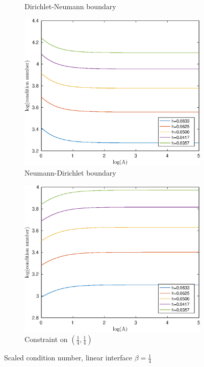 \documentclass[12pt]{article}
\begin{document}
\begin{figure}[h!]
\begin{subfigure}{0.4\textwidth}
\caption{Dirichlet-Neumann boundary}
\end{subfigure}
\vfill
\begin{subfigure}{0.4\textwidth}
\includegraphics[width=\textwidth]{cond-A-2D-linear-ND}
\caption{Neumann-Dirichlet boundary}
\end{subfigure}
\hfill
\begin{subfigure}{0.4\textwidth}
\includegraphics[width=\textwidth]{cond-A-2D-linear-interface}
\caption{Constraint on $(\frac{1}{4}, \frac{1}{4})$}
\end{subfigure}
\caption{Scaled condition number, linear interface $\beta=\frac{1}{4}$}
\end{figure}
\end{document}
